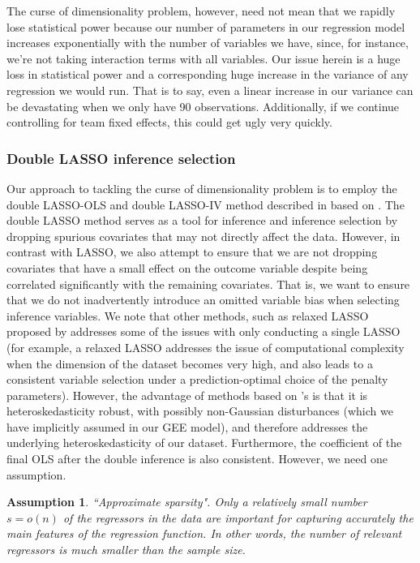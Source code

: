 \documentclass[12pt]{article}
\newtheorem{assumption}{Assumption}
\begin{document}
	The curse of dimensionality problem, however, need not mean that we rapidly lose statistical power because our number of parameters in our regression model increases exponentially with the number of variables we have, since, for instance, we're not taking interaction terms with all variables. Our issue herein is a huge loss in statistical power and a corresponding huge increase in the variance of any regression we would run. That is to say, even a linear increase in our variance can be devastating when we only have 90 observations. Additionally, if we continue controlling for team fixed effects, this could get ugly very quickly.
	
	\subsubsection{Double LASSO inference selection}
	
	Our approach to tackling the curse of dimensionality problem is to employ the double LASSO-OLS and double LASSO-IV method described in \cite{urminsky_using_2016} based on \cite{belloni_high-dimensional_2014}. The double LASSO method serves as a tool for inference and inference selection by dropping spurious covariates that may not directly affect the data. However, in contrast with LASSO, we also attempt to ensure that we are not dropping covariates that have a small effect on the outcome variable despite being correlated significantly with the remaining covariates. That is, we want to ensure that we do not inadvertently introduce an omitted variable bias when selecting inference variables. We note that other methods, such as relaxed LASSO proposed by \cite{meinshausen_relaxed_2007} addresses some of the issues with only conducting a single LASSO (for example, a relaxed LASSO addresses the issue of computational complexity when the dimension of the dataset becomes very high, and also leads to a consistent variable selection under a prediction-optimal choice of the penalty parameters). However, the advantage of methods based on \cite{belloni_high-dimensional_2014}'s is that it is heteroskedasticity robust, with possibly non-Gaussian disturbances (which we have implicitly assumed in our GEE model), and therefore addresses the underlying heteroskedasticity of our dataset. Furthermore, the coefficient of the final OLS after the double inference is also consistent. However, we need one assumption.
	
	\begin{assumption}{``Approximate sparsity".}
		Only a relatively small number $s = o\left(n\right)$ of the regressors in the data are important for capturing accurately the main features of the regression function. In other words, the number of relevant regressors is much smaller than the sample size.
	\end{assumption}
\end{document}
